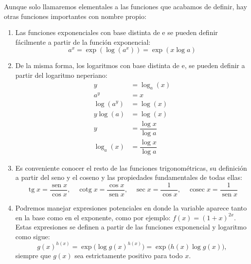 %
\begin{ejemplo}\label{ej:funele2}
Aunque solo llamaremos elementales a las funciones que acabamos de definir, hay otras funciones importantes  con nombre propio:
\begin{enumerate}
\item
Las funciones exponenciales con base distinta de e se pueden definir fácilmente a partir de la función exponencial:
\[
a^x = \exp(\log(a^x)) = \exp(x\log a)
\]
\item
De la misma forma, los logaritmos con base distinta de e, se pueden definir a partir del logaritmo neperiano:
\begin{align*}
y&=\log_a(x)\\
a^y &= x \\
\log(a^y) &= \log(x)\\
y\log(a) &= \log(x)\\
y &= \dfrac{\log x}{\log a}\\
\log_a(x) &=\dfrac{\log x}{\log a}
\end{align*}
\item
Es conveniente conocer el resto de las funciones trigonométricas, su definición a partir del seno y el coseno y las propiedades fundamentales de todas ellas:
\[
\operatorname{tg} x=\dfrac{\operatorname{sen} x}{\cos x},\quad
\operatorname{cotg} x=\dfrac{\cos x}{\operatorname{sen} x},\quad
\sec x =\dfrac1{\cos x},\quad
\operatorname{cosec} x =\dfrac1{\operatorname{sen} x}
\]

\item
\label{func:exp-pot}
Podremos manejar expresiones potenciales en donde la variable aparece tanto en la base como en el exponente, como por ejemplo: $f(x)=(1+x)^{2x}$.
Estas expresiones se definen a partir de las funciones exponencial y logaritmo como sigue:
\[
g(x)^{h(x)}=\exp\big(\log g(x)^{h(x)}\big)=\exp\big(h(x)\log g(x)\big),
\]
siempre que $g(x)$ sea estrictamente positivo para todo $x$.\fej
\end{enumerate}
\end{ejemplo}



